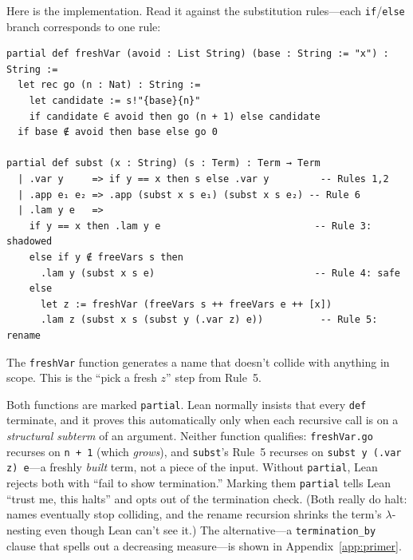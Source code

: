 \documentclass[11pt,a4paper]{article}
\theoremstyle{definition}
\begin{document}
Here is the implementation. Read it against the substitution rules---each
\texttt{if}/\texttt{else} branch corresponds to one rule:

\begin{verbatim}
partial def freshVar (avoid : List String) (base : String := "x") : String :=
  let rec go (n : Nat) : String :=
    let candidate := s!"{base}{n}"
    if candidate ∈ avoid then go (n + 1) else candidate
  if base ∉ avoid then base else go 0

partial def subst (x : String) (s : Term) : Term → Term
  | .var y     => if y == x then s else .var y         -- Rules 1,2
  | .app e₁ e₂ => .app (subst x s e₁) (subst x s e₂) -- Rule 6
  | .lam y e   =>
    if y == x then .lam y e                           -- Rule 3: shadowed
    else if y ∉ freeVars s then
      .lam y (subst x s e)                            -- Rule 4: safe
    else
      let z := freshVar (freeVars s ++ freeVars e ++ [x])
      .lam z (subst x s (subst y (.var z) e))          -- Rule 5: rename
\end{verbatim}

The \texttt{freshVar} function generates a name that doesn't collide with
anything in scope. This is the ``pick a fresh $z$'' step from Rule~5.

\begin{warning}
Both functions are marked \texttt{partial}. Lean normally insists that every
\texttt{def} terminate, and it proves this automatically only when each
recursive call is on a \emph{structural subterm} of an argument. Neither
function qualifies: \texttt{freshVar.go} recurses on \texttt{n + 1} (which
\emph{grows}), and \texttt{subst}'s Rule~5 recurses on
\texttt{subst y (.var z) e}---a freshly \emph{built} term, not a piece of the
input. Without \texttt{partial}, Lean rejects both with ``fail to show
termination.'' Marking them \texttt{partial} tells Lean ``trust me, this
halts'' and opts out of the termination check. (Both really do halt: names
eventually stop colliding, and the rename recursion shrinks the term's
$\lambda$-nesting even though Lean can't see it.) The alternative---a
\texttt{termination\_by} clause that spells out a decreasing measure---is
shown in Appendix~\ref{app:primer}.
\end{warning}
\end{document}
